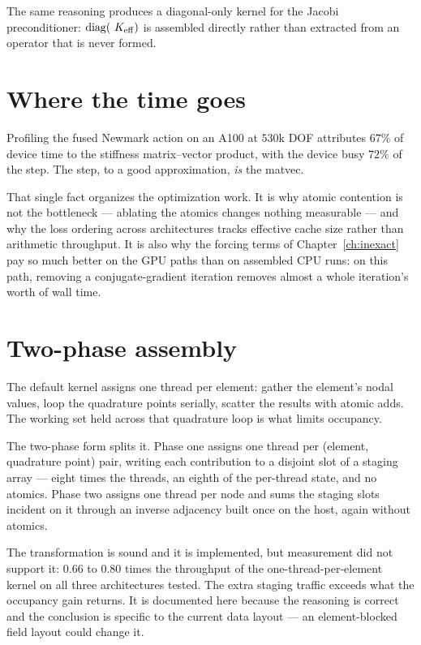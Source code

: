 The same reasoning produces a diagonal-only kernel for the Jacobi
preconditioner: $\operatorname{diag}(~K_{\mathrm{eff}})$ is assembled directly rather than extracted from
an operator that is never formed.

\section{Where the time goes}

Profiling the fused Newmark action on an A100 at $530$k DOF attributes $67\%$
of device time to the stiffness matrix--vector product, with the device busy
$72\%$ of the step.  The step, to a good approximation, \emph{is} the matvec.

That single fact organizes the optimization work.  It is why atomic contention
is not the bottleneck --- ablating the atomics changes nothing measurable ---
and why the loss ordering across architectures tracks effective cache size
rather than arithmetic throughput.  It is also why the forcing terms of
Chapter~\ref{ch:inexact} pay so much better on the GPU paths than on assembled
CPU runs: on this path, removing a conjugate-gradient iteration removes almost
a whole iteration's worth of wall time.

\section{Two-phase assembly}

The default kernel assigns one thread per element: gather the element's nodal
values, loop the quadrature points serially, scatter the results with atomic
adds.  The working set held across that quadrature loop is what limits
occupancy.

The two-phase form splits it.  Phase one assigns one thread per
(element, quadrature point) pair, writing each contribution to a disjoint slot
of a staging array --- eight times the threads, an eighth of the per-thread
state, and no atomics.  Phase two assigns one thread per node and sums the
staging slots incident on it through an inverse adjacency built once on the
host, again without atomics.

The transformation is sound and it is implemented, but measurement did not
support it: $0.66$ to $0.80$ times the throughput of the one-thread-per-element
kernel on all three architectures tested.  The extra staging traffic exceeds
what the occupancy gain returns.  It is documented here because the reasoning
is correct and the conclusion is specific to the current data layout --- an
element-blocked field layout could change it.

